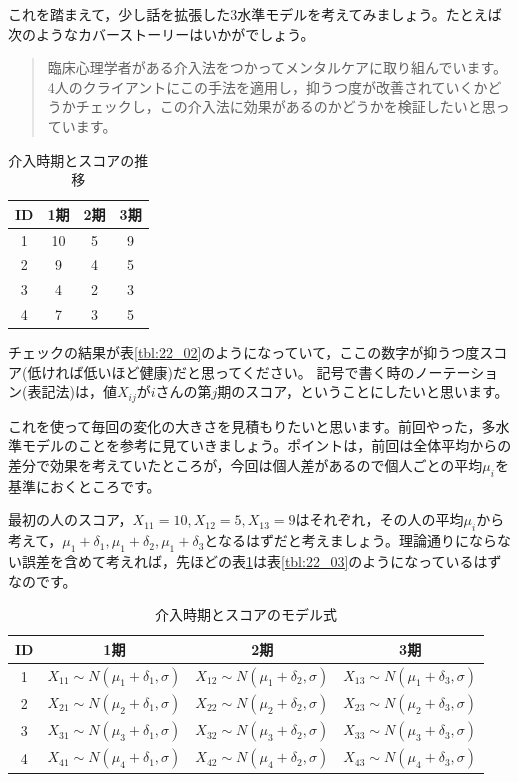 \documentclass{ltjsbook}
\begin{document}
これを踏まえて，少し話を拡張した3水準モデルを考えてみましょう。たとえば次のようなカバーストーリーはいかがでしょう。
\begin{quote}
臨床心理学者がある介入法をつかってメンタルケアに取り組んでいます。
4人のクライアントにこの手法を適用し，抑うつ度が改善されていくかどうかチェックし，この介入法に効果があるのかどうかを検証したいと思っています。
\end{quote}
\begin{table}
    \centering
    \caption{介入時期とスコアの推移}
    \begin{tabular}{cccc}
    ID & 1期 & 2期 & 3期 \\\hline
    1 & 10 & 5 & 9 \\
    2 & 9 & 4 & 5\\
    3 & 4 & 2 & 3\\
    4 & 7 & 3 & 5\\\hline
    \end{tabular}
    \label{tbl::22_02}
\end{table}
チェックの結果が表\ref{tbl:22_02}のようになっていて，ここの数字が抑うつ度スコア(低ければ低いほど健康)だと思ってください。
記号で書く時のノーテーション(表記法)は，値$X_{ij}$が$i$さんの第$j$期のスコア，ということにしたいと思います。

これを使って毎回の変化の大きさを見積もりたいと思います。前回やった，多水準モデルのことを参考に見ていきましょう。ポイントは，前回は全体平均からの差分で効果を考えていたところが，今回は個人差があるので個人ごとの平均$\mu_i$を基準におくところです。

最初の人のスコア，$X_{11}=10,X_{12}=5,X_{13}=9$はそれぞれ，その人の平均$\mu_i$から考えて，$\mu_1+\delta_1,\mu_1+\delta_2,\mu_1+\delta_3$となるはずだと考えましょう。理論通りにならない誤差を含めて考えれば，先ほどの表\ref{tbl::22_02}は表\ref{tbl:22_03}のようになっているはずなのです。
\begin{table}
    \centering
    \caption{介入時期とスコアのモデル式}
    \begin{tabular}{cccc}
    ID & 1期 & 2期 & 3期 \\\hline
    1 & $X_{11}\sim N(\mu_1+\delta_1,\sigma)$ & $X_{12}\sim N(\mu_1+\delta_2,\sigma)$ & $X_{13}\sim N(\mu_1+\delta_3,\sigma)$ \\
    2 & $X_{21}\sim N(\mu_2+\delta_1,\sigma)$ & $X_{22}\sim N(\mu_2+\delta_2,\sigma)$ & $X_{23}\sim N(\mu_2+\delta_3,\sigma)$ \\
    3 & $X_{31}\sim N(\mu_3+\delta_1,\sigma)$ & $X_{32}\sim N(\mu_3+\delta_2,\sigma)$ & $X_{33}\sim N(\mu_3+\delta_3,\sigma)$ \\
    4 & $X_{41}\sim N(\mu_4+\delta_1,\sigma)$ & $X_{42}\sim N(\mu_4+\delta_2,\sigma)$ & $X_{43}\sim N(\mu_4+\delta_3,\sigma)$ \\\hline
    \end{tabular}
    \label{tbl::22_03}
\end{table}
\end{document}
